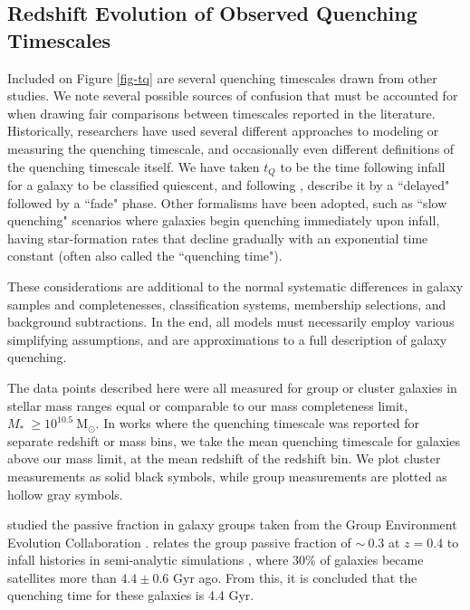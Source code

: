 \subsection{Redshift Evolution of Observed Quenching Timescales}

Included on Figure \ref{fig-tq} are several quenching timescales drawn from other studies.
We note several possible sources of confusion that must be accounted for when drawing fair comparisons between timescales reported in the literature.
Historically, researchers have used several different approaches to modeling or measuring the quenching timescale, and occasionally even different definitions of the quenching timescale itself.
We have taken $t_Q$ to be the time following infall for a galaxy to be classified quiescent, and following \citet{Wetzel:2013aa}, describe it by a ``delayed" followed by a ``fade" phase.
Other formalisms have been adopted, such as ``slow quenching" scenarios where galaxies begin quenching immediately upon infall, having star-formation rates that decline gradually with an exponential time constant (often also called the ``quenching time").

These considerations are additional to the normal systematic differences in galaxy samples and completenesses, classification systems, membership selections, and background subtractions.
In the end, all models must necessarily employ various simplifying assumptions, and are approximations to a full description of galaxy quenching.

The data points described here were all measured for group or cluster galaxies in stellar mass ranges equal or comparable to our mass completeness limit, $M_*~\ge 10^{10.5}~ \mathrm{M}_\odot$.
In works where the quenching timescale was reported for separate redshift or mass bins, we take the mean quenching timescale for galaxies above our mass limit, at the mean redshift of the redshift bin.
We plot cluster measurements as solid black symbols, while group measurements are plotted as hollow gray symbols.

\citet{McGee:2011aa,McGee:2014aa} studied the passive fraction in galaxy groups taken from the Group Environment Evolution Collaboration \citep[GEEC and GEEC2,][]{Balogh:2014aa}.
\citet{McGee:2014aa} relates the group passive fraction of $\sim~0.3$ at $z=0.4$ to infall histories in semi-analytic simulations \citep{McGee:2009aa}, where 30\% of galaxies became satellites more than $4.4\pm0.6$ Gyr ago.
From this, it is concluded that the quenching time for these galaxies is 4.4 Gyr.

